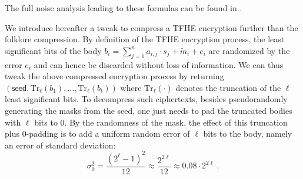The full noise analysis leading to these formulas can be found in \cite{phd_tap}.


\fi

We introduce hereafter a tweak to compress a \gls{TFHE} encryption further than the folklore compression. By definition of the \gls{TFHE} encryption process, the least significant bits of the body $b_i = \sum_{j=1}^n a_{i,j} \cdot s_j + \tilde{m}_i + e_i$ are randomized by the error $e_i$ and can hence be discarded without loss of information. We can thus tweak the above compressed encryption process by returning $(\mathsf{seed}, \mathrm{Tr}_\ell(b_1), \ldots, \mathrm{Tr}_\ell(b_t))$ where $\mathrm{Tr}_\ell(\cdot)$ denotes the truncation of the $\ell$ least significant bits. To decompress such ciphertexts, besides pseudorandomly generating the masks from the seed, one just needs to pad the truncated bodies with $\ell$ bits to $0$. By the randomness of the mask, the effect of this truncation plus $0$-padding is to add a uniform random error of $\ell$ bits to the body, namely an error of standard deviation: 
$$\sigma_0^2  = \frac{(2^\ell - 1)^2}{12} \approx \frac{2^{2\ell}}{12} \approx 0.08 \cdot 2^{2\ell} ~.$$

